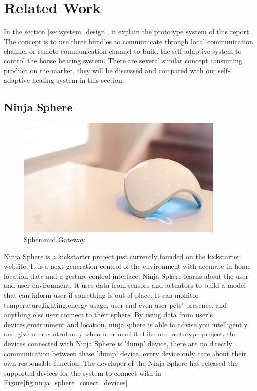 \section{Related Work}
\label{sec:related_work}
\par In the section \ref{sec:system_design}, it explain the prototype system of this report. The concept is to use three bundles to communicate through local communication channel or remote communication channel to build the self-adaptive system to control the house heating system. There are several similar concept consuming product on the market, they will be discussed and compared with our self-adaptive heating system in this section.

\subsection{Ninja Sphere}

\begin{figure}
	\centering    	
\includegraphics[width=0.90\textwidth,natwidth=610,natheight=642]{figs/ninja_sphere_gateway.png}
  	\caption{Spheramid Gateway}
  	\label{fig:ninja_sphere_gateway}
\end{figure}

\par Ninja Sphere\cite{NINJA_SPHERE} is a kickstarter\cite{kickstarter} project just currently founded on the kickstarter website. It is a next generation control of the environment with accurate in-home location data and a gesture control interface. Ninja Sphere learns about the user and user environment. It uses data from sensors and actuators to build a model that can inform user if something is out of place. It can monitor temperature,lighting,energy usage, user and even user pets' presence, and anything else user connect to their sphere. By using data from user's devices,environment and location, ninja sphere is able to advise you intelligently and give user control only when user need it. Like our prototype project, the devices connected with Ninja Sphere is 'dump' device, there are no directly communication between these 'dump' device, every device only care about their own responsible function.
The developer of the Ninja Sphere has released the supported devices for the system to connect with in Figure\ref{fig:ninja_sphere_conect_devices}.

